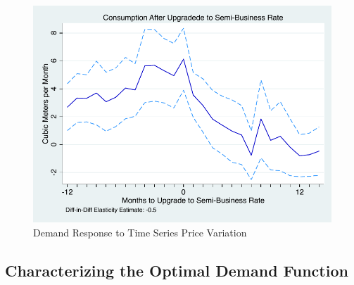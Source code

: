 \documentclass[12pt]{article}
\begin{document}
\begin{appendices}
\begin{figure}
\caption{Demand Response to Time Series Price Variation}\label{figure:semieventstudy}
\begin{center}
\includegraphics[scale=.7]{tables/sem_event.pdf}
\end{center}
\end{figure}








\subsection{Characterizing the Optimal Demand Function}\label{appendix:optimaldemand}


\end{appendices}
\end{document}
